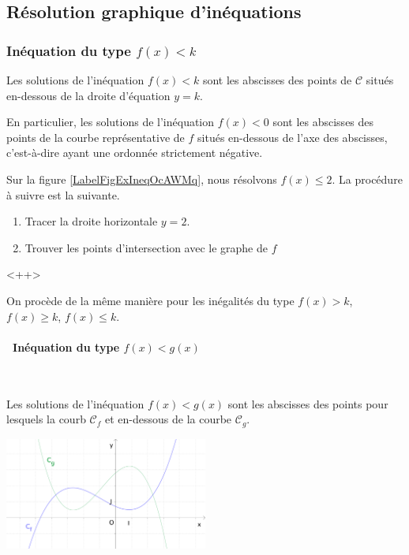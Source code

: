 \subsection{Résolution graphique d'inéquations}


\subsubsection{Inéquation du type $f(x)<k$}

\begin{Aretenir}
Les solutions de l'inéquation $f(x)<k$ sont les abscisses des points de $\mathscr{C}$ situés en-dessous de la droite d'équation $y=k$.

En particulier, les solutions de l'inéquation $f(x)<0$ sont les abscisses des points de la courbe représentative de \( f\) situés en-dessous de l'axe des abscisses, c'est-à-dire ayant une ordonnée strictement négative.
\end{Aretenir}

Sur la figure \ref{LabelFigExIneqOcAWMq}, nous résolvons \( f(x)\leq 2\). La procédure à suivre est la suivante.
\begin{enumerate}
    \item
        Tracer la droite horizontale \( y=2\).
    \item
        Trouver les points d'intersection avec le graphe de \( f\)
\end{enumerate}
<++>
\newcommand{\CaptionFigExIneqOcAWMq}{Les solutions de l'équation \( f(x)\leq 2\) sont en ondulé.}



On procède de la même manière pour les inégalités du type $f(x)>k$,
$f(x)\geq k$, $f(x)\leq k$. 

\paragraph{\textbullet \ Inéquation du type $f(x)<g(x)$} \ \par
Les solutions de l'inéquation $f(x)<g(x)$ sont les abscisses des
points pour lesquels la courb $\mathscr{C}_f$ et en-dessous de la
courbe $\mathscr{C}_g$.

\medskip

{\centering
  \includegraphics[width=0.5\textwidth]{F_resineq_fg.pdf}
\par}

